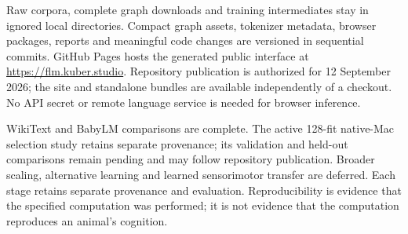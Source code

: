 \documentclass[10pt]{article}
\begin{document}
Raw corpora, complete graph downloads and training intermediates stay in ignored local directories. Compact graph assets, tokenizer metadata, browser packages, reports and meaningful code changes are versioned in sequential commits. GitHub Pages hosts the generated public interface at \url{https://flm.kuber.studio}. Repository publication is authorized for 12 September 2026; the site and standalone bundles are available independently of a checkout. No API secret or remote language service is needed for browser inference.

WikiText and BabyLM comparisons are complete. The active 128-fit native-Mac selection study retains separate provenance; its validation and held-out comparisons remain pending and may follow repository publication. Broader scaling, alternative learning and learned sensorimotor transfer are deferred. Each stage retains separate provenance and evaluation. Reproducibility is evidence that the specified computation was performed; it is not evidence that the computation reproduces an animal's cognition.

\begingroup\raggedright


\endgroup
\end{document}
